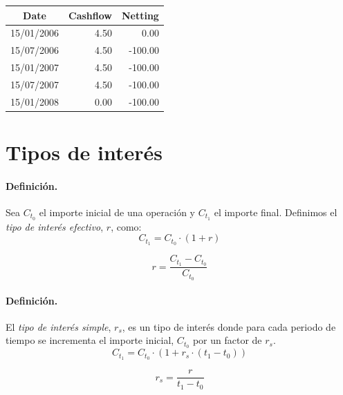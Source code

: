 \begin{center}
\begin{tabular}{c|r|r}
\textbf{Date} & \textbf{Cashflow} & \textbf{Netting} \\
\hline
15/01/2006 &     4.50 &    0.00 \\
15/07/2006 &     4.50 & -100.00 \\
15/01/2007 &     4.50 & -100.00 \\
15/07/2007 &     4.50 & -100.00 \\
15/01/2008 &     0.00 & -100.00
\end{tabular}
\end{center}



\section{Tipos de inter\'es}
\label{sec:interests}

\paragraph{Definici\'on.}
Sea $C_{t_0}$ el importe inicial de una operaci\'on y $C_{t_1}$ el importe final. 
Definimos el \emph{tipo de inter\'es efectivo}, $r$,
como:
\begin{equation}
C_{t_1} = C_{t_0} \cdot (1+r)
\end{equation}

\begin{equation}
\label{tipus_efectiu}
r = \frac{C_{t_1}-C_{t_0}}{C_{t_0}}
\end{equation}

\paragraph{Definici\'on.}
El \emph{tipo de inter\'es simple}, $r_s$, es un tipo
de inter\'es donde para cada periodo de tiempo se incrementa el importe inicial, $C_{t_0}$
por un factor de $r_s$.
\begin{equation}
C_{t_1} = C_{t_0} \cdot (1+ r_s \cdot (t_1-t_0))
\end{equation}

\begin{equation}
\label{interes_simple_1}
r_s = \frac{r}{t_1 - t_0}
\end{equation}

